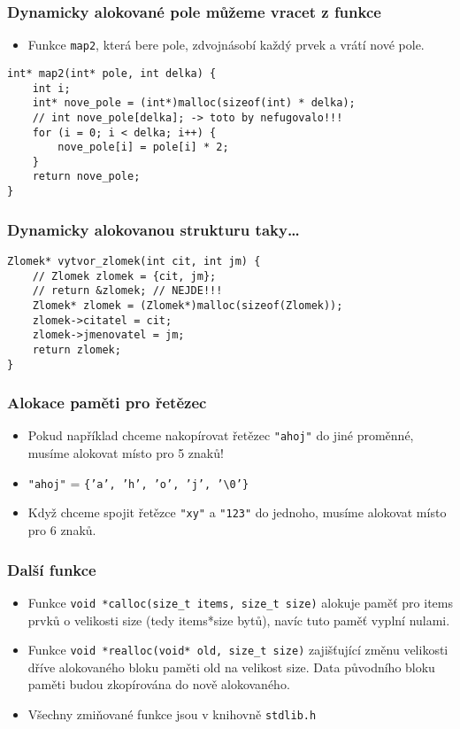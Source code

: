 \documentclass{beamer}
\newenvironment{itemizex}%
  {\large \begin{itemize}%
    \setlength{\itemsep}{8pt}%
    \setlength{\parskip}{8pt}}%
  {\end{itemize}}
\begin{document}
\begin{frame}[t,fragile]\frametitle{Dynamicky alokované pole můžeme vracet z funkce} 
    \begin{itemizex}
        \item Funkce \texttt{map2}, která bere pole, zdvojnásobí každý prvek a vrátí nové pole.
    \end{itemizex}

    \begin{verbatim} 
int* map2(int* pole, int delka) {
    int i;
    int* nove_pole = (int*)malloc(sizeof(int) * delka);
    // int nove_pole[delka]; -> toto by nefugovalo!!!
    for (i = 0; i < delka; i++) {
        nove_pole[i] = pole[i] * 2;
    }
    return nove_pole;
}
    \end{verbatim}
\end{frame}


\begin{frame}[t,fragile]\frametitle{Dynamicky alokovanou strukturu taky\dots} 
\begin{verbatim} 
Zlomek* vytvor_zlomek(int cit, int jm) {
    // Zlomek zlomek = {cit, jm}; 
    // return &zlomek; // NEJDE!!!
    Zlomek* zlomek = (Zlomek*)malloc(sizeof(Zlomek));
    zlomek->citatel = cit;
    zlomek->jmenovatel = jm;
    return zlomek;
}
\end{verbatim}
\end{frame}


\begin{frame}[t,fragile]\frametitle{Alokace paměti pro řetězec} 
    \begin{itemizex}
        \item Pokud například chceme nakopírovat řetězec \texttt{"ahoj"} do jiné proměnné, musíme alokovat místo pro 5 znaků!
        \item \texttt{"ahoj"} = \texttt{\{'a', 'h', 'o', 'j', '\textbackslash0'\}}
        \item Když chceme spojit řetězce \texttt{"xy"} a \texttt{"123"} do jednoho, musíme alokovat místo pro 6 znaků.
    \end{itemizex}
\end{frame}


\begin{frame}[t,fragile]\frametitle{Další funkce} 
    \begin{itemizex}
        \item Funkce \texttt{void *calloc(size\_t items, size\_t size)} alokuje paměť pro items prvků o velikosti size (tedy items*size bytů), navíc tuto paměť vyplní nulami.
        \item Funkce \texttt{void *realloc(void* old, size\_t size)} zajišťující změnu velikosti dříve alokovaného bloku paměti old na velikost size. Data původního bloku paměti budou zkopírována do nově alokovaného.
        \item Všechny zmiňované funkce jsou v knihovně \texttt{stdlib.h}
    \end{itemizex}
\end{frame}
\end{document}

